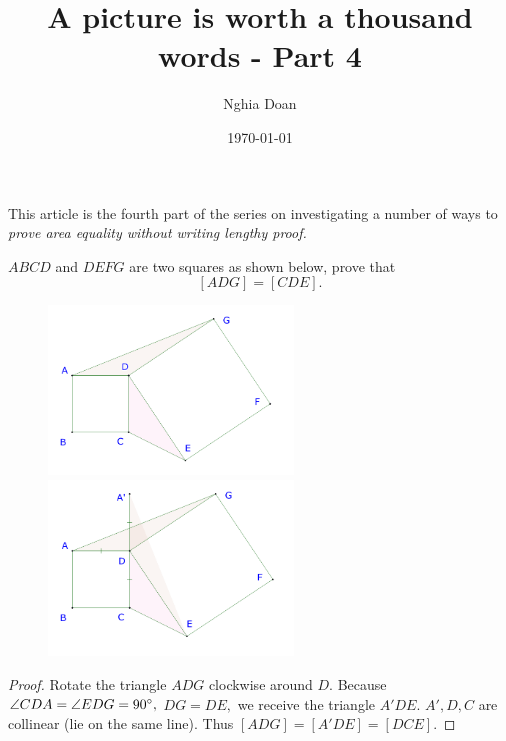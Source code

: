 \documentclass{article}
\title{A picture is worth a thousand words - Part 4}
\author{Nghia Doan}
\date{\today}
\begin{document}
\maketitle

This article is the fourth part of the series on investigating a number of ways to \textit{prove area equality without writing lengthy proof.}

\begin{example*}[Example 16]
    $ABCD$ and $DEFG$ are two squares as shown below, prove that
    \[
        [ADG] = [CDE].
    \]
\end{example*}

\begin{figure}[h]
    \centering
    \begin{minipage}[t]{6.5cm}
        \begin{center}
            \includegraphics[width=6.5cm]{./svg/pdf/23-24-s3-i-p17.pdf}
        \end{center}
    \end{minipage}
    \qquad
    \begin{minipage}[t]{6.5cm}
        \centering
        \begin{center}
            \includegraphics[width=6.5cm]{./svg/pdf/23-24-s3-i-p17-s.pdf}
        \end{center}
    \end{minipage}
\end{figure}

\begin{proof}
    Rotate the triangle $ADG$ clockwise around $D.$ Because $\angle CDA = \angle EDG = 90^\circ,$ $DG = DE,$ we receive the triangle $A'DE.$
    $A', D, C$ are collinear (lie on the same line). Thus $[ADG] = [A'DE] = [DCE].$
\end{proof}
\end{document}
